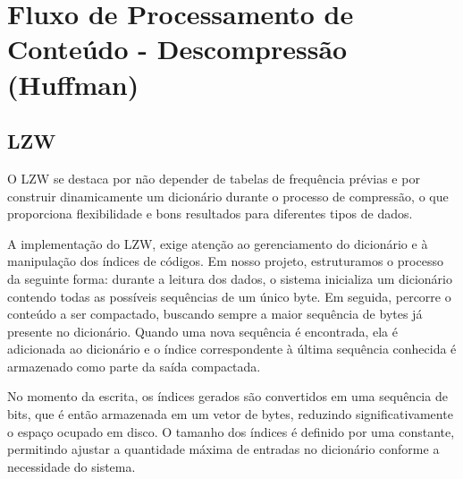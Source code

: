 \documentclass[12pt]{article}
\begin{document}
\section*{Fluxo de Processamento de Conteúdo - Descompressão (Huffman)} 
\begin{center} 
\end{center}

\subsection*{LZW}
O LZW se destaca por não depender de tabelas de frequência prévias e por construir dinamicamente um dicionário durante o processo de compressão, o que proporciona flexibilidade e bons resultados para diferentes tipos de dados.

A implementação do LZW, exige atenção ao gerenciamento do dicionário e à manipulação dos índices de códigos. Em nosso projeto, estruturamos o processo da seguinte forma: durante a leitura dos dados, o sistema inicializa um dicionário contendo todas as possíveis sequências de um único byte. Em seguida, percorre o conteúdo a ser compactado, buscando sempre a maior sequência de bytes já presente no dicionário. Quando uma nova sequência é encontrada, ela é adicionada ao dicionário e o índice correspondente à última sequência conhecida é armazenado como parte da saída compactada.

No momento da escrita, os índices gerados são convertidos em uma sequência de bits, que é então armazenada em um vetor de bytes, reduzindo significativamente o espaço ocupado em disco. O tamanho dos índices é definido por uma constante, permitindo ajustar a quantidade máxima de entradas no dicionário conforme a necessidade do sistema.
\end{document}
